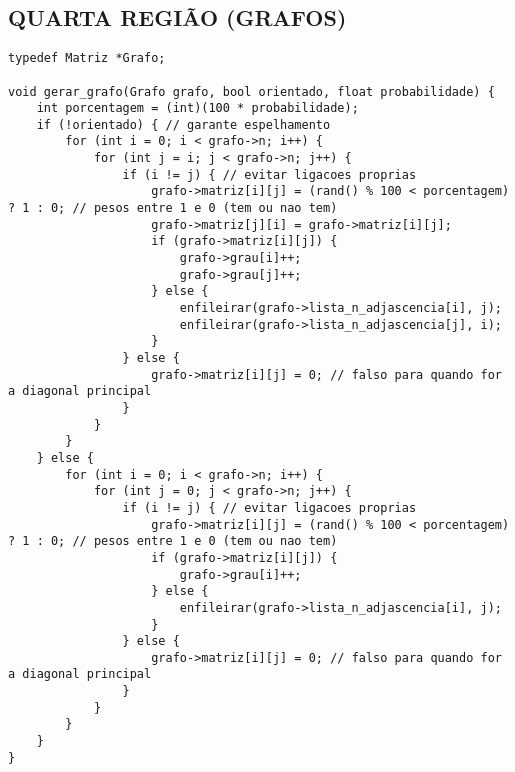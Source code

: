 \documentclass[12pt, openright, oneside, a4paper, chapter=TITLE, section=TITLE, subsection=TITLE, subsubsection=TITLE, brazil]{abntex2}
\newenvironment{codebox}%
  {\begin{mdframed}[backgroundcolor=gray!5, linecolor=gray, roundcorner=5pt]}%
  {\end{mdframed}}
\begin{document}
\subsection{QUARTA REGIÃO (GRAFOS)}
\begin{codebox}
\begin{verbatim}
typedef Matriz *Grafo;

void gerar_grafo(Grafo grafo, bool orientado, float probabilidade) {
    int porcentagem = (int)(100 * probabilidade);
    if (!orientado) { // garante espelhamento
        for (int i = 0; i < grafo->n; i++) {
            for (int j = i; j < grafo->n; j++) {
                if (i != j) { // evitar ligacoes proprias
                    grafo->matriz[i][j] = (rand() % 100 < porcentagem) ? 1 : 0; // pesos entre 1 e 0 (tem ou nao tem)
                    grafo->matriz[j][i] = grafo->matriz[i][j];
                    if (grafo->matriz[i][j]) {
                        grafo->grau[i]++;
                        grafo->grau[j]++;
                    } else {
                        enfileirar(grafo->lista_n_adjascencia[i], j);
                        enfileirar(grafo->lista_n_adjascencia[j], i);
                    }
                } else {
                    grafo->matriz[i][j] = 0; // falso para quando for a diagonal principal
                }
            }
        }
    } else {
        for (int i = 0; i < grafo->n; i++) {
            for (int j = 0; j < grafo->n; j++) {
                if (i != j) { // evitar ligacoes proprias
                    grafo->matriz[i][j] = (rand() % 100 < porcentagem) ? 1 : 0; // pesos entre 1 e 0 (tem ou nao tem)
                    if (grafo->matriz[i][j]) {
                        grafo->grau[i]++;
                    } else {
                        enfileirar(grafo->lista_n_adjascencia[i], j);
                    }
                } else {
                    grafo->matriz[i][j] = 0; // falso para quando for a diagonal principal
                }
            }
        }
    }
}


\end{verbatim}
\end{codebox}
\end{document}
